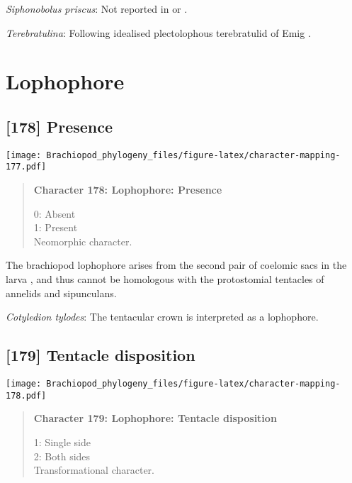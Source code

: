 \documentclass[openany]{book}
\theoremstyle{definition}
\theoremstyle{definition}
\theoremstyle{definition}
\theoremstyle{remark}
\begin{document}
\hypertarget{Siphonobolus_priscus-coding-177}{}
\emph{Siphonobolus priscus}: Not reported in
\citet{Havlicek1982LingulaceaPaterinacea} or
\citet{Williams2000LinguliformeaCraniiformea}.

\hypertarget{Terebratulina-coding-177}{}
\emph{Terebratulina}: Following idealised plectolophous terebratulid of
Emig \citeyearpar{Emig1992Functionaldisposition}.

\section{Lophophore}\label{lophophore}

\subsection*{{[}178{]} Presence}\label{presence-4}

\texttt{[image: Brachiopod\_phylogeny\_files/figure-latex/character-mapping-177.pdf]}

\begin{quote}
\textbf{Character 178: Lophophore: Presence}

0: Absent\\
1: Present\\
Neomorphic character.
\end{quote}

The brachiopod lophophore arises from the second pair of coelomic sacs
in the larva \citep{Nielsen1991}, and thus cannot be homologous with the
protostomial tentacles of annelids and sipunculans.

\hypertarget{Cotyledion_tylodes-coding-178}{}
\emph{Cotyledion tylodes}: The tentacular crown \citep{Zhang2013} is
interpreted as a lophophore.

\subsection*{{[}179{]} Tentacle disposition}\label{tentacle-disposition}

\texttt{[image: Brachiopod\_phylogeny\_files/figure-latex/character-mapping-178.pdf]}

\begin{quote}
\textbf{Character 179: Lophophore: Tentacle disposition}

1: Single side\\
2: Both sides\\
Transformational character.
\end{quote}
\end{document}
